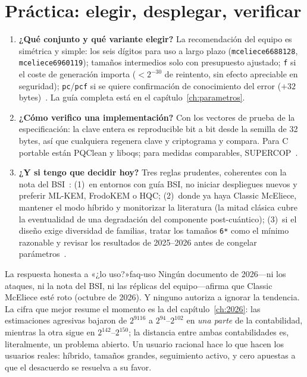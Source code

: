 \documentclass[11pt,a4paper,oneside]{report}
\begin{document}
\section{Práctica: elegir, desplegar, verificar}

\begin{enumerate}[leftmargin=1.9em,itemsep=5pt,start=17]
  \item \textbf{¿Qué conjunto y qué variante elegir?} La
        recomendación del equipo es simétrica y simple: los seis
        dígitos para uso a largo plazo (\texttt{mceliece6688128},
        \texttt{mceliece6960119}); tamaños intermedios solo con
        presupuesto ajustado; \texttt{f} si el coste de generación
        importa ($<2^{-30}$ de reintento, sin efecto apreciable en
        seguridad); \texttt{pc}/\texttt{pcf} si se quiere
        confirmación de conocimiento del error ($+32$
        bytes)~\cite{cmsecurity,cmiso}. La guía completa está en el
        capítulo~\ref{ch:parametros}.

  \item \textbf{¿Cómo verifico una implementación?} Con los
        vectores de prueba de la especificación: la clave entera es
        reproducible bit a bit desde la semilla de 32 bytes, así
        que cualquiera regenera clave y criptograma y compara. Para
        C portable están PQClean y liboqs; para medidas
        comparables, SUPERCOP~\cite{cmimpl}.

  \item \textbf{¿Y si tengo que decidir hoy?} Tres reglas
        prudentes, coherentes con la nota del
        BSI~\cite{bsi2026}: (1)~en entornos con guía BSI, no
        iniciar despliegues nuevos y preferir ML-KEM, FrodoKEM o
        HQC; (2)~donde ya haya Classic McEliece, mantener el modo
        híbrido y monitorizar la literatura (la mitad clásica cubre
        la eventualidad de una degradación del componente
        post-cuántico); (3)~si el diseño exige diversidad de
        familias, tratar los tamaños \texttt{6*} como el mínimo
        razonable y revisar los resultados de 2025--2026 antes de
        congelar parámetros~\cite{cm610,cmsecurity}.
\end{enumerate}

\begin{observacion}{La respuesta honesta a «¿lo uso?»}{faq-uso}
Ningún documento de 2026---ni los ataques, ni la nota del BSI, ni
las réplicas del equipo---afirma que Classic McEliece esté roto
(octubre de 2026). Y ninguno autoriza a ignorar la tendencia. La
cifra que mejor resume el momento es la del capítulo~\ref{ch:2026}:
las estimaciones agresivas bajaron de $2^{9116}$ a $2^{94}$--$2^{102}$
en \emph{una parte} de la contabilidad, mientras la otra sigue en
$2^{142}$--$2^{150}$; la distancia entre ambas contabilidades es,
literalmente, un problema abierto. Un usuario racional hace lo que
hacen los usuarios reales: híbrido, tamaños grandes, seguimiento
activo, y cero apuestas a que el desacuerdo se resuelva a su favor.
\end{observacion}
\end{document}
